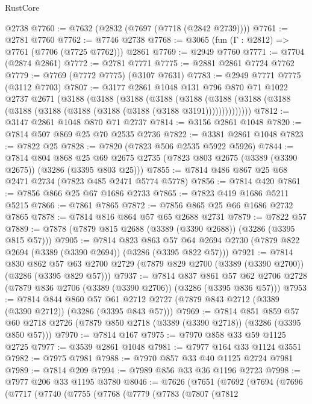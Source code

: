 \begin{lexlean}{RustCore}
\begin{coremodule}
    @2738
@7760 := @7632 (@2832 (@7697 (@7718 (@2842 @2739))))
@7761 := @2781 @7760
@7762 := @7746 @2738
@7768 := @3065 (fun (Γ : @2812) => @7761 (@7706 (@7725 @7762))) @2861
@7769 := @2949 @7760
@7771 := @7704 (@2874 @2861)
@7772 := @2781 @7771
@7775 := @2881 @2861 @7724 @7762
@7779 := @7769 (@7772 @7775) (@3107 @7631)
@7783 := @2949 @7771 @7775 (@3112 @7703)
@7807 := @3177
    @2861
    @1048
    @131
    @796
    @870
    @71
    @1022
    @2737
    @2671
    (@3188
      (@3188
        (@3188
          (@3188
            (@3188
              (@3188 (@3188 (@3188 (@3188 (@3188 (@3188 (@3188 (@3188 (@3188 @3191))))))))))))))
@7812 := @3147 @2861 @1048 @870 @71 @2737
@7814 := @3156 @2861 @1048
@7820 := @7814 @507 @869 @25 @70 @2535 @2736
@7822 := @3381 @2861 @1048
@7823 := @7822 @25
@7828 := @7820 (@7823 @506 @2535 @5922 @5926)
@7844 := @7814
    @804
    @868
    @25
    @69
    @2675
    @2735
    (@7823 @803 @2675 (@3389 (@3390 @2675)) (@3286 (@3395 @803 @25)))
@7855 := @7814 @486 @867 @25 @68 @2471 @2734 (@7823 @485 @2471 @5774 @5778)
@7856 := @7814 @420
@7861 := @7856 @866 @25 @67 @1686 @2733
@7865 := @7823 @419 @1686 @5211 @5215
@7866 := @7861 @7865
@7872 := @7856 @865 @25 @66 @1686 @2732 @7865
@7878 := @7814 @816 @864 @57 @65 @2688 @2731
@7879 := @7822 @57
@7889 := @7878 (@7879 @815 @2688 (@3389 (@3390 @2688)) (@3286 (@3395 @815 @57)))
@7905 := @7814
    @823
    @863
    @57
    @64
    @2694
    @2730
    (@7879 @822 @2694 (@3389 (@3390 @2694)) (@3286 (@3395 @822 @57)))
@7921 := @7814
    @830
    @862
    @57
    @63
    @2700
    @2729
    (@7879 @829 @2700 (@3389 (@3390 @2700)) (@3286 (@3395 @829 @57)))
@7937 := @7814
    @837
    @861
    @57
    @62
    @2706
    @2728
    (@7879 @836 @2706 (@3389 (@3390 @2706)) (@3286 (@3395 @836 @57)))
@7953 := @7814
    @844
    @860
    @57
    @61
    @2712
    @2727
    (@7879 @843 @2712 (@3389 (@3390 @2712)) (@3286 (@3395 @843 @57)))
@7969 := @7814
    @851
    @859
    @57
    @60
    @2718
    @2726
    (@7879 @850 @2718 (@3389 (@3390 @2718)) (@3286 (@3395 @850 @57)))
@7970 := @7814 @167
@7975 := @7970 @858 @33 @59 @1125 @2725
@7977 := @3539 @2861 @1048
@7981 := @7977 @164 @33 @1124 @3551
@7982 := @7975 @7981
@7988 := @7970 @857 @33 @40 @1125 @2724 @7981
@7989 := @7814 @209
@7994 := @7989 @856 @33 @36 @1196 @2723
@7998 := @7977 @206 @33 @1195 @3780
@8046 := @7626
    (@7651
      (@7692
        (@7694
          (@7696
            (@7717
              (@7740
                (@7755
                  (@7768
                    (@7779
                      (@7783
                        (@7807
                          (@7812

\end{coremodule}
\end{lexlean}
